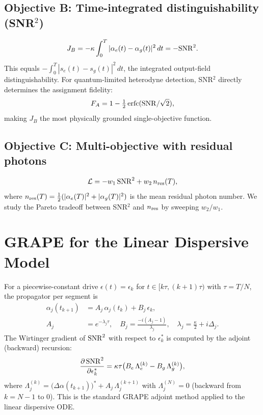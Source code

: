 \documentclass[twocolumn,prl,aps,floatfix]{revtex4-2}
\begin{document}
\subsection{Objective B: Time-integrated distinguishability (SNR$^2$)}
\begin{equation}
  J_B = -\kappa \int_0^T |\alpha_e(t) - \alpha_g(t)|^2 \,dt = -{\rm SNR}^2.
  \label{eq:jb}
\end{equation}
This equals $-\int_0^T |s_e(t) - s_g(t)|^2\,dt$, the integrated output-field
distinguishability.  For quantum-limited heterodyne detection, SNR$^2$ directly
determines the assignment fidelity:
\begin{equation}
  F_A = 1 - \tfrac{1}{2}\,{\rm erfc}({\rm SNR}/\sqrt{2}),
  \label{eq:fa}
\end{equation}
making $J_B$ the most physically grounded single-objective function.

\subsection{Objective C: Multi-objective with residual photons}
\begin{equation}
  \mathcal{L} = -w_1\,{\rm SNR}^2 + w_2\,n_{\rm res}(T),
  \label{eq:multi}
\end{equation}
where $n_{\rm res}(T) = \tfrac{1}{2}(|\alpha_e(T)|^2 + |\alpha_g(T)|^2)$ is the
mean residual photon number.  We study the Pareto tradeoff between SNR$^2$ and
$n_{\rm res}$ by sweeping $w_2/w_1$.

\section{GRAPE for the Linear Dispersive Model}

For a piecewise-constant drive $\epsilon(t) = \epsilon_k$ for $t \in [k\tau, (k+1)\tau)$
with $\tau = T/N$, the propagator per segment is
\begin{align}
  \alpha_j(t_{k+1}) &= A_j\,\alpha_j(t_k) + B_j\,\epsilon_k, \\
  A_j &= e^{-\lambda_j\tau},\quad
  B_j = \frac{-i(A_j - 1)}{\lambda_j},\quad
  \lambda_j = \tfrac{\kappa}{2} + i\Delta_j.
\end{align}
The Wirtinger gradient of ${\rm SNR}^2$ with respect to $\epsilon_k^*$ is computed
by the adjoint (backward) recursion:
\begin{equation}
  \frac{\partial\,{\rm SNR}^2}{\partial \epsilon_k^*}
    = \kappa\tau\bigl(B_e\,\Lambda_e^{(k)} - B_g\,\Lambda_g^{(k)}\bigr),
  \label{eq:grape_grad}
\end{equation}
where $\Lambda_j^{(k)} = \bigl(\Delta\alpha(t_{k+1})\bigr)^* + A_j\,\Lambda_j^{(k+1)}$
with $\Lambda_j^{(N)} = 0$ (backward from $k = N-1$ to $0$).
This is the standard GRAPE adjoint method applied to the linear dispersive ODE.
\end{document}
